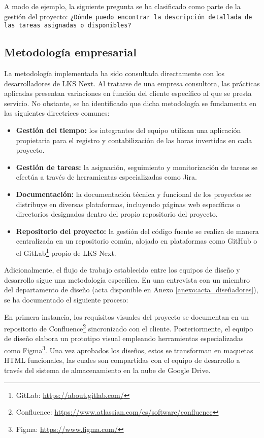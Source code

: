 A modo de ejemplo, la siguiente pregunta se ha clasificado como parte de la gestión del proyecto: \texttt{¿Dónde puedo encontrar la descripción detallada de las tareas asignadas o disponibles?}

\subsection{Metodología empresarial}
La metodología implementada ha sido consultada directamente con los desarrolladores de LKS Next. Al tratarse de una empresa consultora, las prácticas aplicadas presentan variaciones en función del cliente específico al que se presta servicio. No obstante, se ha identificado que dicha metodología se fundamenta en las siguientes directrices comunes:
\begin{itemize}
\item\textbf{Gestión del tiempo: }los integrantes del equipo utilizan una aplicación propietaria para el registro y contabilización de las horas invertidas en cada proyecto.
\item\textbf{Gestión de tareas: }la asignación, seguimiento y monitorización de tareas se efectúa a través de herramientas especializadas como Jira.
\item\textbf{Documentación: }la documentación técnica y funcional de los proyectos se distribuye en diversas plataformas, incluyendo páginas web específicas o directorios designados dentro del propio repositorio del proyecto.
\item\textbf{Repositorio del proyecto: }la gestión del código fuente se realiza de manera centralizada en un repositorio común, alojado en plataformas como GitHub o el GitLab\footnote{GitLab: \url{https://about.gitlab.com/}} propio de LKS Next.

\end{itemize}
Adicionalmente, el flujo de trabajo establecido entre los equipos de diseño y desarrollo sigue una metodología específica. En una entrevista con un miembro del departamento de diseño (acta disponible en Anexo \ref{anexo:acta_diseñadores}), se ha documentado el siguiente proceso:

En primera instancia, los requisitos visuales del proyecto se documentan en un repositorio de Confluence\footnote{Confluence: \url{https://www.atlassian.com/es/software/confluence}} sincronizado con el cliente. Posteriormente, el equipo de diseño elabora un prototipo visual empleando herramientas especializadas como Figma\footnote{Figma: \url{https://www.figma.com/}}. Una vez aprobados los diseños, estos se transforman en maquetas HTML funcionales, las cuales son compartidas con el equipo de desarrollo a través del sistema de almacenamiento en la nube de Google Drive.


